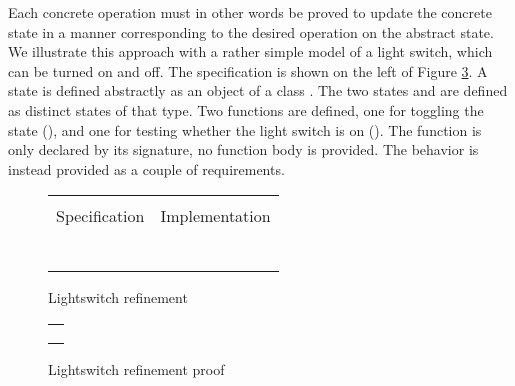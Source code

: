 \noindent
Each concrete operation must in other words be proved to update the concrete state
in a manner corresponding to the desired operation on the abstract state.
We illustrate this approach with a rather simple \Klang{} model of a light switch,
which can be turned on and off.  The specification is shown on the left of
Figure \ref{fig:lightswitch}. A state is defined abstractly as an object of 
a class . The two states  and  are defined as 
distinct states of that type. Two functions are defined, one for toggling
the state (), and one for testing whether the light switch is on
(). The  function is only declared by its signature, no 
function body is provided. The behavior is instead provided  as a couple of
requirements.

\begin{figure}
  \centering
  \begin{tabular}[c]{c|c}
    \hline \\
    Specification & Implementation \\
    \hline\hline \\ \\
    \begin{subfigure}[c]{0.5\textwidth}
     
      \label{fig:lightswitch1}
    \end{subfigure}
    &
    \begin{subfigure}[c]{0.5\textwidth}
      
      \label{fig:lightswicth2}
    \end{subfigure}
    \\ \\
    \hline
  \end{tabular}    
  \caption{Lightswitch refinement}
  \label{fig:lightswitch}
\end{figure}

\begin{figure}
\centering
\begin{tabular}{c}
\hline \\
 \\ \\
\hline
\end{tabular}
\caption{Lightswitch refinement proof}
\label{fig:lightswitch-proof}
\end{figure}

